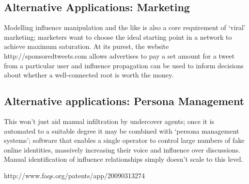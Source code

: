 \subsection{Alternative Applications: Marketing}
Modelling influence manipulation and the like is also a core requirement of
`viral' marketing; marketers want to choose the ideal starting point in a
network to achieve maximum saturation. At its purest, the website
http://sponsoredtweets.com allows advertises to pay a set amount for a tweet
from a particular user and influence propagation can be used to inform decisions
about whether a well-connected root is worth the money. 

\subsection{Alternative applications: Persona Management}
This won't just aid manual infiltration by undercover agents; once it is
automated to a suitable degree it may be combined with `persona management
systems'; software that enables a single operator to control large numbers of
fake online identities, massively increasing their voice and influence over
discussions. Manual identification of influence relationships simply doesn't
scale to this level.

http://www.faqs.org/patents/app/20090313274


% 

